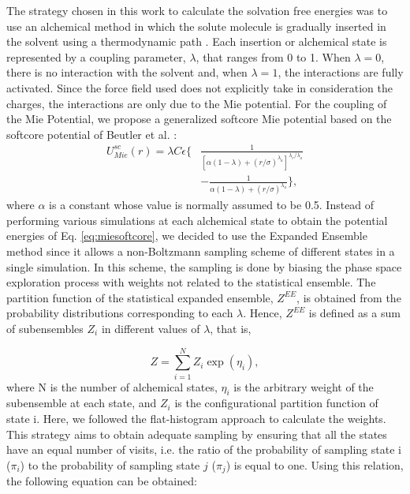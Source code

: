 \documentclass[final,12p,times,twocolumn]{elsarticle}
\begin{document}
	The strategy chosen in this work to calculate the solvation free energies  was to use an alchemical method in which the solute molecule is gradually inserted in the solvent using a  thermodynamic path \cite{klimovich}. Each insertion or alchemical state is represented by a coupling parameter, $\lambda$, that ranges from 0 to 1. When $\lambda=0$, there is no interaction with the solvent and, when $\lambda=1$, the interactions are fully activated. Since the force field used does not explicitly take in consideration  the charges, the interactions are only due to the Mie potential. For the coupling of the Mie Potential, we propose a generalized softcore Mie potential based on the softcore potential of Beutler et al. \cite{beutler}:
	\begin{equation}
	\label{eq:miesoftcore}
	\begin{aligned}
	U_{Mie}^{sc}(r) = \lambda C \epsilon \Bigg\lbrace & \frac{1}{\left[\alpha(1-\lambda)+ (r/\sigma)^{\lambda_a}\right]^{\lambda_{r}/\lambda_{a}}} \\ &-\frac{1}{\alpha(1-\lambda)+(r/\sigma)^{\lambda_a}} \Bigg\rbrace,
	\end{aligned}
	\end{equation}
	where $\alpha$ is a constant whose value is  normally assumed to be 0.5. Instead of performing various simulations at each alchemical state to obtain the potential energies of Eq. \ref{eq:miesoftcore}, we decided to use the Expanded Ensemble method \cite{lyubartsev} since it allows a non-Boltzmann sampling scheme of different states in a single simulation. In this scheme, the sampling is done by biasing the phase space exploration process with weights not related to the statistical ensemble. The partition function of the statistical expanded ensemble, $Z^{EE}$, is obtained from the probability distributions corresponding to each $\lambda$. Hence, $Z^{EE}$ is defined as a sum of subensembles $Z_{i}$ in different values of $\lambda$, that is,
	
	\begin{equation}
	Z = \sum_{i=1}^{N} Z_{i} \exp(\eta_{i}),
	\label{ee}
	\end{equation}   
	where N is the number of alchemical states, $\eta_{i}$ is the arbitrary weight of the subensemble at each state, and $Z_{i}$ is the configurational partition function of state i. Here, we followed the flat-histogram approach \cite{bernd1992,bernd1993,dayal2004} to calculate the weights. This strategy aims to obtain adequate sampling by ensuring that all the states have an equal number of visits, i.e. the ratio of the probability of sampling state i ($\pi_{i}$) to the probability of sampling state $j$ ($\pi_{j}$) is equal to one. Using this relation, the following equation can be obtained:
	
\end{document}
